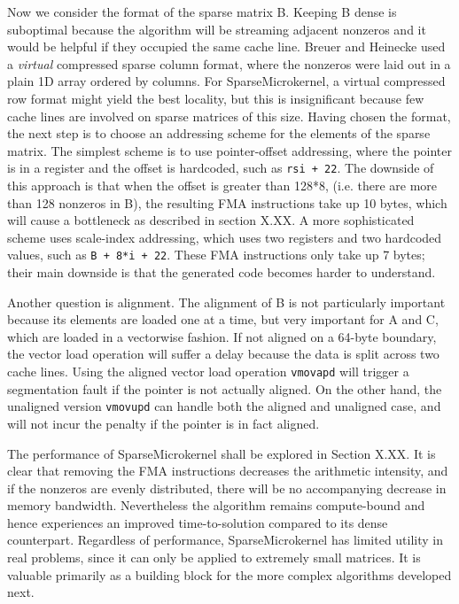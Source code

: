 Now we consider the format of the sparse matrix B. Keeping B dense is suboptimal because the algorithm will be streaming adjacent nonzeros and it would be helpful if they occupied the same cache line. Breuer and Heinecke used a \emph{virtual} compressed sparse column format, where the nonzeros were laid out in a plain 1D array ordered by columns. For SparseMicrokernel, a virtual compressed row format might yield the best locality, but this is insignificant because few cache lines are involved on sparse matrices of this size. Having chosen the format, the next step is to choose an addressing scheme for the elements of the sparse matrix. The simplest scheme is to use pointer-offset addressing, where the pointer is in a register and the offset is hardcoded, such as \texttt{rsi + 22}. The downside of this approach is that when the offset is greater than 128*8, (i.e. there are more than 128 nonzeros in B), the resulting FMA instructions take up 10 bytes, which will cause a bottleneck as described in section X.XX. A more sophisticated scheme uses scale-index addressing, which uses two registers and two hardcoded values, such as \texttt{B + 8*i + 22}. These FMA instructions only take up 7 bytes; their main downside is that the generated code becomes harder to understand.

Another question is alignment. The alignment of B is not particularly important because its elements are loaded one at a time, but very important for A and C, which are loaded in a vectorwise fashion. If not aligned on a 64-byte boundary, the vector load operation will suffer a delay because the data is split across two cache lines. Using the aligned vector load operation \texttt{vmovapd} will trigger a segmentation fault if the pointer is not actually aligned. On the other hand, the unaligned version \texttt{vmovupd} can handle both the aligned and unaligned case, and will not incur the penalty if the pointer is in fact aligned. 

The performance of SparseMicrokernel shall be explored in Section X.XX. It is clear that removing the FMA instructions decreases the arithmetic intensity, and if the nonzeros are evenly distributed, there will be no accompanying decrease in memory bandwidth. Nevertheless the algorithm remains compute-bound and hence experiences an improved time-to-solution compared to its dense counterpart. Regardless of performance, SparseMicrokernel has limited utility in real problems, since it can only be applied to extremely small matrices. It is valuable primarily as a building block for the more complex algorithms developed next.


